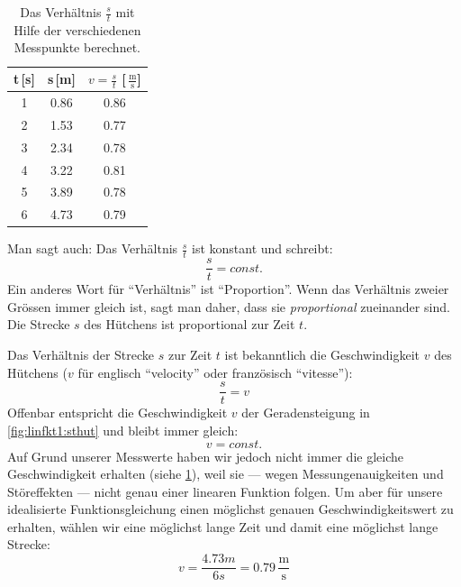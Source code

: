 \documentclass[%
11pt,%
twoside,%
titlepage,%
german,%
headsepline%
]{scrartcl}
\newcommand{\ufrac}[2]{\ensuremath{\,\frac{\mathrm{#1}}{\mathrm{#2}}}}
\newcommand{\begriff}[1]{``#1''}
\begin{document}
\begin{table}[t!]
  \centering
  \begin{tabular}{|c|c|c|}
    \hline
    t\,[s] & s\,[m] & $v=\frac{s}{t}$ [$\!\ufrac{m}{s}$] \\[0.5ex] \hline\hline
	1 & 0.86 & 0.86 \\ \hline
	2 & 1.53 & 0.77 \\ \hline
	3 & 2.34 & 0.78 \\ \hline
	4 & 3.22 & 0.81 \\ \hline
	5 & 3.89 & 0.78 \\ \hline
	6 & 4.73 & 0.79 \\ \hline
  \end{tabular}
  \caption{Das Verh\"altnis $\frac{s}{t}$ mit Hilfe der verschiedenen Messpunkte berechnet.}
  \label{tab:linfkt1:vhut}
\end{table}

Man sagt auch: Das Verh\"altnis $\frac{s}{t}$ ist konstant und schreibt:
\begin{displaymath}
\frac{s}{t}=const.
\end{displaymath}
Ein anderes Wort f\"ur \begriff{Verh\"altnis} ist \begriff{Proportion}. Wenn das Verh\"altnis zweier Gr\"ossen immer gleich ist, sagt man daher, dass sie \emph{proportional} zueinander sind. Die Strecke $s$ des H\"utchens ist proportional zur Zeit $t$.

Das Verh\"altnis der Strecke $s$ zur Zeit $t$ ist bekanntlich die Geschwindigkeit $v$ des H\"utchens ($v$ f\"ur englisch \begriff{velocity} oder franz\"osisch \begriff{vitesse}):
\begin{displaymath}
\frac{s}{t}=v
\end{displaymath}
Offenbar entspricht die Geschwindigkeit $v$ der Geradensteigung in \ref{fig:linfkt1:sthut} und bleibt immer gleich:
\begin{displaymath}
v=const.
\end{displaymath}
Auf Grund unserer Messwerte haben wir jedoch nicht immer die gleiche Geschwindigkeit erhalten (siehe \ref{tab:linfkt1:vhut}), weil sie --- wegen Messungenauigkeiten und St\"oreffekten --- nicht genau einer linearen Funktion folgen. Um aber f\"ur unsere idealisierte Funktionsgleichung einen m\"oglichst genauen Geschwindigkeitswert zu erhalten, w\"ahlen wir eine m\"oglichst lange Zeit und damit eine m\"oglichst lange Strecke:
\begin{displaymath}
v=\frac{4.73\unit{m}}{6\unit{s}}=0.79\ufrac{m}{s}
\end{displaymath}
\end{document}
